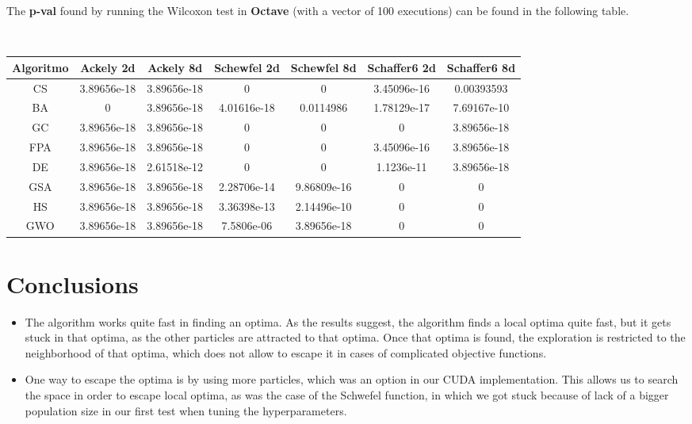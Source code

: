 \documentclass[journal,onecolumn]{IEEEtran}
\begin{document}
The \textbf{p-val} found by running the Wilcoxon test in \textbf{Octave} (with a vector of 100 executions) can be found in the following table.

\textbf{~}\\
\begin{tabular}{|c|c|c|c|c|c|c|}

\hline \textbf{Algoritmo} & \textbf{Ackely 2d} & \textbf{Ackely 8d} & \textbf{Schewfel 2d} & \textbf{Schewfel 8d} & \textbf{Schaffer6 2d} & \textbf{Schaffer6 8d} \\\hline

CS      & 3.89656e-18   & 3.89656e-18   & 0             & 0           & 3.45096e-16  & 0.00393593 \\\hline
BA      & 0             & 3.89656e-18   & 4.01616e-18   & 0.0114986   & 1.78129e-17  & 7.69167e-10\\\hline
GC      & 3.89656e-18   & 3.89656e-18   & 0             & 0           & 0            & 3.89656e-18\\\hline
FPA     & 3.89656e-18   & 3.89656e-18   & 0             & 0           & 3.45096e-16  & 3.89656e-18\\\hline
DE      & 3.89656e-18   & 2.61518e-12   & 0             & 0           & 1.1236e-11   & 3.89656e-18\\\hline
GSA     & 3.89656e-18   & 3.89656e-18   & 2.28706e-14   & 9.86809e-16 & 0            & 0          \\\hline
HS      & 3.89656e-18   & 3.89656e-18   & 3.36398e-13   & 2.14496e-10 & 0            & 0          \\\hline
GWO     & 3.89656e-18   & 3.89656e-18   & 7.5806e-06    & 3.89656e-18 & 0            & 0\\\hline

\end{tabular}

\section{Conclusions}

\begin{itemize}

    \item The algorithm works quite fast in finding an optima. As the results suggest, the algorithm finds a local optima quite fast, but it gets stuck in that optima, as the other particles are attracted to that optima. Once that optima is found, the exploration is restricted to the neighborhood of that optima, which does not allow to escape it in cases of complicated objective functions.

    \item One way to escape the optima is by using more particles, which was an option in our CUDA implementation. This allows us to search the space in order to escape local optima, as was the case of the Schwefel function, in which we got stuck because of lack of a bigger population size in our first test when tuning the hyperparameters.

\end{itemize}
\end{document}
